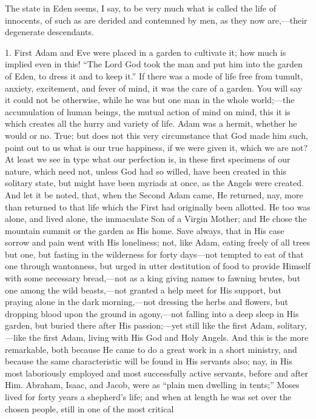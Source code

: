 The state in Eden seems, I say, to be very much what is called the
life of innocents, of such as are derided and contemned by men, as
they now are,—their degenerate descendants.

1. First Adam and Eve were placed in a garden to cultivate it; how
much is implied even in this! ``The Lord God took the man and put
him into the garden of Eden, to dress it and to keep it.'' If
there was a mode of life free from tumult, anxiety, excitement, and
fever of mind, it was the care of a garden. You will say it could not
be otherwise, while he was but one man in the whole world;—the
accumulation of human beings, the mutual action of mind on mind, this
it is which creates all the hurry and variety of life. Adam was a
hermit, whether he would or no. True; but does not this very
circumstance that God made him such, point out to us what is our true
happiness, if we were given it, which we are not? At least we see in
type what our perfection is, in these first specimens of our nature,
which need not, unless God had so willed, have been created in this
solitary state, but might have been myriads at once, as the Angels
were created. And let it be noted, that, when the Second Adam came, He
returned, nay, more than returned to that life which the First had
originally been allotted. He too was alone, and lived alone, the
immaculate Son of a Virgin Mother; and He chose the mountain summit or
the garden as His home. Save always, that in His case sorrow and pain
went with His loneliness; not, like Adam, eating freely of all trees
but one, but fasting in the wilderness for forty days—not tempted to
eat of that one through wantonness, but urged in utter destitution of
food to provide Himself with some necessary bread,—not as a king
giving names to fawning brutes, but one among the wild beasts,—not
granted a help meet for His support, but praying alone in the dark
morning,—not dressing the herbs and flowers, but dropping blood upon
the ground in agony,—not falling into a deep sleep in His garden,
but buried there after His passion;—yet still like the first Adam,
solitary,—like the first Adam, living with His God and Holy Angels.
And this is the more remarkable, both because He came to do a great
work in a short ministry, and because the same characteristic will be
found in His servants also; nay, in His most laboriously employed and
most successfully active servants, before and after Him. Abraham,
Isaac, and Jacob, were as ``plain men dwelling in tents;''
Moses lived for forty years a shepherd's life; and when at length he
was set over the chosen people, still in one of the most critical
